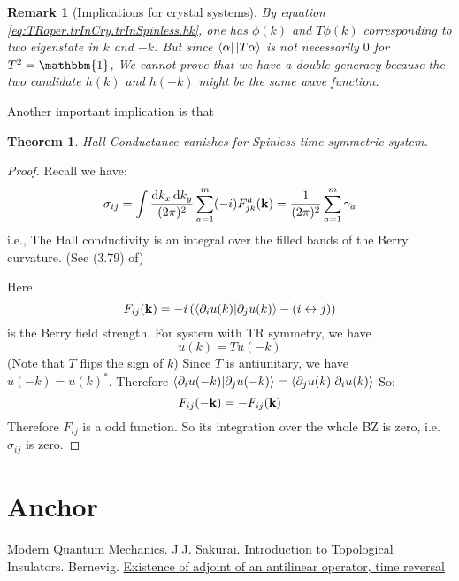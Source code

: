 \documentclass{article}
\newcommand*\diff{\mathop{}\!\mathrm{d}}
\numberwithin{equation}{subsection} %
\newtheorem{thm}{Theorem}[section]
\newtheorem{remark}{Remark}[section]
\theoremstyle{definition}
\begin{document}
        \begin{remark}[Implications for crystal systems]
            By equation \ref{eq:TRoper.trInCry.trInSpinless.hk}, one has
            $\phi(k)$ and $T\phi(k)$ corresponding to two eigenstate in
            $k$ and $-k$. But since $\bra{\alpha}\ket{T\alpha}$ is not
            necessarily $0$ for $T^2= \mathbbm{1}$, We cannot prove
            that we have a double generacy because the two candidate
            $h(k)$ and $h(-k)$ might be the same wave function.
        \end{remark}

        Another important implication is that
        \begin{thm}
            Hall Conductance vanishes for Spinless time
            symmetric system.  
        \end{thm}
        \begin{proof}
            Recall we have:
            \begin{align}
                \sigma_{ij} = \int \frac{\diff k_x\diff k_y}{(2\pi)^2}
                \sum_{a=1}^{m} (-i) F_{jk}^a(\vb{k})
                = \frac{1}{(2\pi)^2} \sum_{a=1}^m \gamma_a
            \end{align}
            i.e., The Hall conductivity is an integral over the filled
            bands of the Berry curvature. (See (3.79) of\cite{bernevig})

            Here 
            $$F_{ij}(\vb{k}) = -i \left( \braket{\partial_i
            u(k)|\partial_j u(k)} - (i\leftrightarrow j) \right)$$
            is the Berry field strength.
            For system with TR symmetry, we have
            $$ u(k) = T u(-k)$$
            (Note that $T$ flips the sign of $k$) Since $T$ is
            antiunitary, we have $ u(-k) = u(k)^*$. Therefore
            $\braket{\partial_i u(-k)|\partial_j u(-k)} = 
              \braket{\partial_j u(k)|\partial_i u(k)}$
            So:
            \begin{equation}
                F_{ij}(\vb{-k}) = - F_{ij}(\vb{k})
            \end{equation}
            Therefore $F_{ij}$ is a odd function. So its integration
            over the whole BZ is zero, i.e. $\sigma_{ij}$ is zero.
        \end{proof}
        
        
\section{Anchor}
\label{sec:Anchor}
\begin{thebibliography}{1}
     Modern Quantum Mechanics. J.J. Sakurai.
     Introduction to Topological Insulators. Bernevig.
    \href{http://physics.stackexchange.com/questions/45227/existence-of-adjoint-of-an-antilinear-operator-time-reversal}{Existence of adjoint of an antilinear operator, time reversal}
\end{thebibliography}
\printnomenclature
\end{document}
